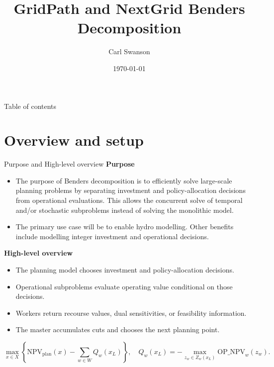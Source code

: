 \documentclass[aspectratio=169,10pt]{beamer}
\title[GridPath Benders]{GridPath and NextGrid Benders Decomposition}
\author{Carl Swanson}
\date{\today}
\begin{document}
\begin{frame}\titlepage\end{frame}

\begin{frame}{Table of contents}
\tableofcontents[hideallsubsections]
\end{frame}

\section{Overview and setup}

\begin{frame}{Purpose and High-level overview}
\textbf{Purpose}
\begin{itemize}
\item The purpose of Benders decomposition is to efficiently solve large-scale planning problems 
by separating investment and policy-allocation decisions from operational evaluations. This allows the 
concurrent solve of temporal and/or stochastic subproblems instead of solving the monolithic model.
\item The primary use case will be to enable hydro modelling. Other benefits include modelling integer 
investment and operational decisions.
\end{itemize}
\textbf{High-level overview}
\begin{itemize}
\item The planning model chooses investment and policy-allocation decisions.
\item Operational subproblems evaluate operating value conditional on those decisions.
\item Workers return recourse values, dual sensitivities, or feasibility information.
\item The master accumulates cuts and chooses the next planning point.
\end{itemize}
\[
\max_{x\in X}\left\{\mathrm{NPV}_{\mathrm{plan}}(x)-\sum_{w\in W}Q_w(x_L)\right\},
\quad Q_w(x_L)=-\max_{z_w\in Z_w(x_L)}\mathrm{OP\_NPV}_w(z_w).
\]
\end{frame}
\end{document}
